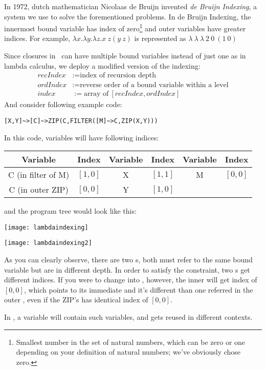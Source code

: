 In 1972, dutch mathematician Nicolaas de Bruijn invented \emph{de Bruijn Indexing}, a system we use to solve the forementioned problems. In de Bruijn Indexing, the innermost bound variable has index of zero\footnote{Smallest number in the set of natural numbers, which can be zero or one depending on your definition of natural numbers; we've obviously chose zero.} and outer variables have greater indices. For example, $\lambda x . \lambda y . \lambda z . x\ z (y\ z)$ is represented as $\lambda\ \lambda\ \lambda\ 2\ 0\ (1\ 0)$

Since closures in \tbas\ can have multiple bound variables instead of just one as in lambda calculus, we deploy a modified version of the indexing:
\begin{align*}
recIndex &:= \text{index of recursion depth}\\
ordIndex &:= \text{reverse order of a bound variable within a level}\\
index &:= \text{array of}\ [recIndex, ordIndex]
\end{align*}
And consider following example code:
\begin{lstlisting}
[X,Y]~>[C]~>ZIP(C,FILTER([M]~>C,ZIP(X,Y)))
\end{lstlisting}

In this code, variables will have following indices:

\begin{tabulary}{\textwidth}{cC|cC|cC}
Variable & Index & Variable & Index & Variable & Index \\
\hline
C {\condensedfont (in filter of M)} & $[1,0]$ & X & $[1,1]$ & M & $[0,0]$ \\
C {\condensedfont (in outer ZIP)} & $[0,0]$ & Y & $[1,0]$ & \ & \ \\
\end{tabulary}

and the program tree would look like this:

{\centering
\begin{minipage}{.5\textwidth}
  \centering
  \texttt{[image: lambdaindexing]}
  \label{fig:lambdaraw}
\end{minipage}%
\begin{minipage}{.5\textwidth}
  \centering
  \texttt{[image: lambdaindexing2]}
  \label{fig:lambdaindexed}
\end{minipage}
}

As you can clearly observe, there are two s, both must refer to the same bound variable but are in different depth. In order to satisfy the constraint, two s get different indices. If you were to change \code{[M]} into \code{[C]}, however, the inner  will get index of $[0,0]$, which points to its immediate  and it's different  than one referred in the outer , even if the ZIP's  has identical index of $[0,0]$.

In , a variable  will contain such variables, and gets reused in different contexts.
